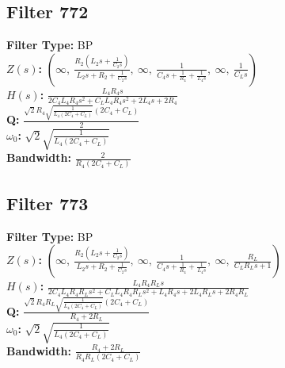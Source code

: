 \documentclass{article}
\begin{document}
\subsection*{Filter 772}
\textbf{Filter Type:} BP \\ 
\textbf{$Z(s)$:} $\left( \infty, \  \frac{R_{2} \left(L_{2} s + \frac{1}{C_{2} s}\right)}{L_{2} s + R_{2} + \frac{1}{C_{2} s}}, \  \infty, \  \frac{1}{C_{4} s + \frac{1}{R_{4}} + \frac{1}{L_{4} s}}, \  \infty, \  \frac{1}{C_{L} s}\right)$ \\ 
\textbf{$H(s)$:} $\frac{L_{4} R_{4} s}{2 C_{4} L_{4} R_{4} s^{2} + C_{L} L_{4} R_{4} s^{2} + 2 L_{4} s + 2 R_{4}}$ \\ 
\textbf{Q:} $\frac{\sqrt{2} R_{4} \sqrt{\frac{1}{L_{4} \left(2 C_{4} + C_{L}\right)}} \left(2 C_{4} + C_{L}\right)}{2}$ \\ 
\textbf{$\omega_0$:} $\sqrt{2} \sqrt{\frac{1}{L_{4} \left(2 C_{4} + C_{L}\right)}}$ \\ 
\textbf{Bandwidth:} $\frac{2}{R_{4} \left(2 C_{4} + C_{L}\right)}$ \\ 
\subsection*{Filter 773}
\textbf{Filter Type:} BP \\ 
\textbf{$Z(s)$:} $\left( \infty, \  \frac{R_{2} \left(L_{2} s + \frac{1}{C_{2} s}\right)}{L_{2} s + R_{2} + \frac{1}{C_{2} s}}, \  \infty, \  \frac{1}{C_{4} s + \frac{1}{R_{4}} + \frac{1}{L_{4} s}}, \  \infty, \  \frac{R_{L}}{C_{L} R_{L} s + 1}\right)$ \\ 
\textbf{$H(s)$:} $\frac{L_{4} R_{4} R_{L} s}{2 C_{4} L_{4} R_{4} R_{L} s^{2} + C_{L} L_{4} R_{4} R_{L} s^{2} + L_{4} R_{4} s + 2 L_{4} R_{L} s + 2 R_{4} R_{L}}$ \\ 
\textbf{Q:} $\frac{\sqrt{2} R_{4} R_{L} \sqrt{\frac{1}{L_{4} \left(2 C_{4} + C_{L}\right)}} \left(2 C_{4} + C_{L}\right)}{R_{4} + 2 R_{L}}$ \\ 
\textbf{$\omega_0$:} $\sqrt{2} \sqrt{\frac{1}{L_{4} \left(2 C_{4} + C_{L}\right)}}$ \\ 
\textbf{Bandwidth:} $\frac{R_{4} + 2 R_{L}}{R_{4} R_{L} \left(2 C_{4} + C_{L}\right)}$ \\ 
\end{document}
